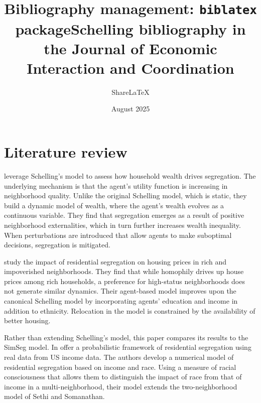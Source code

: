 \documentclass{article}
\title{Bibliography management: \texttt{biblatex} package}
\author{Share\LaTeX}
\date{ }
\title{Schelling bibliography in the Journal of Economic Interaction and Coordination}
\author{}
\date{August 2025}
\begin{document}
\maketitle
\section*{Literature review}

\textcite{vicario2024dynamic} leverage Schelling's model to assess how household wealth drives segregation. The underlying mechanism is that the agent's utility function is increasing in neighborhood quality.
 Unlike the original Schelling model, which is static, they build a dynamic model of wealth, where the agent's wealth evolves as a continuous variable. They find that segregation emerges as a result of positive neighborhood externalities, which in turn further increases wealth inequality. When perturbations are introduced that allow agents to make suboptimal decisions, segregation is mitigated.

\textcite{bonakdar2023dissimilarity} study the impact of residential segregation on housing prices in rich and impoverished neighborhoods. They find that while homophily drives up house prices among rich households, a preference for high-status neighborhoods does not generate similar dynamics. 
Their agent-based model improves upon the canonical Schelling model by incorporating agents' education and income in addition to ethnicity. Relocation in the model is constrained by the availability of better housing.

Rather than extending Schelling’s model, this paper compares its results to the SimSeg model. In \textcite{li2020racial} offer a probabilistic framework of residential segregation using real data from US income data. The authors develop a numerical model of residential segregation based on income and race. Using a measure of racial consciousness that allows them to distinguish the impact of race from that of income in a multi-neighborhood, their model extends the two-neighborhood model of Sethi and Somanathan. 




\printbibliography
\end{document}
